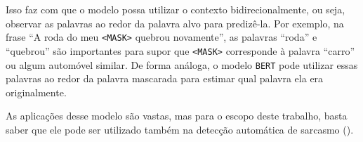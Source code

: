 Isso faz com que o modelo possa utilizar o contexto bidirecionalmente, ou seja,
observar as palavras ao redor da palavra alvo para predizê-la. Por exemplo, na
frase ``A roda do meu \texttt{<MASK>} quebrou novamente'', as palavras ``roda''
e ``quebrou'' são importantes para supor que \texttt{<MASK>} corresponde à
palavra ``carro'' ou algum automóvel similar. De forma análoga, o modelo
\texttt{BERT} pode utilizar essas palavras ao redor da palavra mascarada para
estimar qual palavra ela era originalmente.

As aplicações desse modelo são vastas, mas para o escopo deste trabalho, basta
saber que ele pode ser utilizado também na detecção automática de sarcasmo
(\cite{yaghoobian:2021:sarcasm-detection-comparative-study}).
